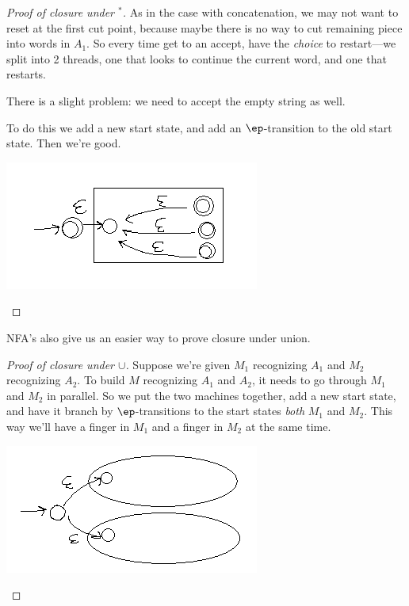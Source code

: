 \begin{proof}[Proof of closure under ${}^*$]
As in the case with concatenation, we may not want to reset at the first cut point, because maybe there is no way to cut remaining piece into words in $A_1$. So every time get to an accept, have the \emph{choice} to restart---we split into 2 threads, one that looks to continue the current word, and one that restarts.

There is a slight problem: we need to accept the empty string as well. %

To do this we add a new start state, and add an $\ep$-transition to the old start state. Then we're good.

\begin{center}
\includegraphics{2-7b}
\end{center} 
\end{proof}

NFA's also give us an easier way to prove closure under union.

\begin{proof}[Proof of closure under $\cup$]
Suppose we're given $M_1$ recognizing $A_1$ and $M_2$ recognizing $A_2$. To build $M$ recognizing $A_1$ and $A_2$, it needs to go through $M_1$ and $M_2$ in parallel. So we put the two machines together, add a new start state, and have it branch by $\ep$-transitions to the start states {\it both} $M_1$ and $M_2$. This way we'll have a finger in $M_1$ and a finger in $M_2$ at the same time.

\begin{center}
\includegraphics{2-11}
\end{center} 
\end{proof}

